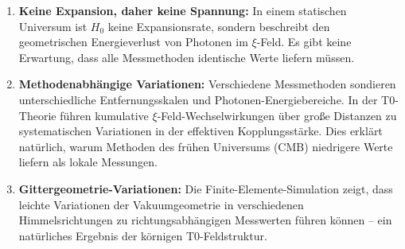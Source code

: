 	\begin{enumerate}
		\item \textbf{Keine Expansion, daher keine Spannung:} In einem statischen Universum ist $H_0$ keine Expansionsrate, sondern beschreibt den geometrischen Energieverlust von Photonen im $\xi$-Feld. Es gibt keine Erwartung, dass alle Messmethoden identische Werte liefern müssen.
		
		\item \textbf{Methodenabhängige Variationen:} Verschiedene Messmethoden sondieren unterschiedliche Entfernungsskalen und Photonen-Energiebereiche. In der T0-Theorie führen kumulative $\xi$-Feld-Wechselwirkungen über große Distanzen zu systematischen Variationen in der effektiven Kopplungsstärke. Dies erklärt natürlich, warum Methoden des frühen Universums (CMB) niedrigere Werte liefern als lokale Messungen.
		
		\item \textbf{Gittergeometrie-Variationen:} Die Finite-Elemente-Simulation zeigt, dass leichte Variationen der Vakuumgeometrie in verschiedenen Himmelsrichtungen zu richtungsabhängigen Messwerten führen können -- ein natürliches Ergebnis der körnigen T0-Feldstruktur.
	\end{enumerate}
	
